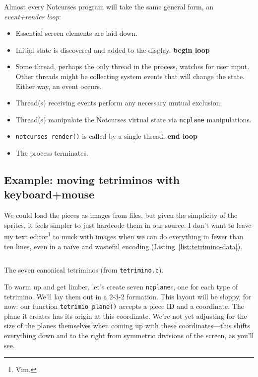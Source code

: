 \documentclass[letterpaper,10pt]{article}
\newenvironment{denseitemize}{
  \begin{itemize}
      \setlength{\itemsep}{0pt}
}{
  \end{itemize}
}
\begin{document}
Almost every Notcurses program will take the same general form, an \textit{event+render loop}:

\begin{denseitemize}
\item{Essential screen elements are laid down.}
\item{Initial state is discovered and added to the display.}
\textbf{begin loop} 
\item{Some thread, perhaps the only thread in the process, watches
    for user input. Other threads might be collecting system events that will
    change the state. Either way, an event occurs.}
\item{Thread(s) receiving events perform any necessary mutual exclusion.}
\item{Thread(s) manipulate the Notcurses virtual state via \texttt{ncplane} manipulations.}
\item{\texttt{notcurses\_render()} is called by a single thread.}
\textbf{end loop}
\item{The process terminates.}
\end{denseitemize}

\subsection{Example: moving tetriminos with keyboard+mouse}

We could load the pieces as images from files, but given the simplicity of the
sprites, it feels simpler to just hardcode them in our source. I don't want to
leave my text editor\footnote{Vim.} to muck with images when we can do everything
in fewer than ten lines, even in a naïve and wasteful encoding (Listing~\ref{list:tetrimino-data}).

\begin{listing}[!htbp]
\inputminted[]{C}{code/tetrimino-data.h}
\caption{The seven canonical tetriminos (from \texttt{tetrimino.c}).}
\label{list:tetrimino-data}
\end{listing}

To warm up and get limber, let's create seven \texttt{ncplane}s, one for each type
of tetrimino. We'll lay them out in a 2-3-2 formation. This layout will be
sloppy, for now: our function
\texttt{tetrimio\_plane()} accepts a piece ID and a coordinate.
The plane it creates has its origin at this coordinate.
We're not yet adjusting for the size of the planes themselves when coming
up with these coordinates---this shifts everything down and to the right from
symmetric divisions of the screen, as you'll see.
\end{document}
